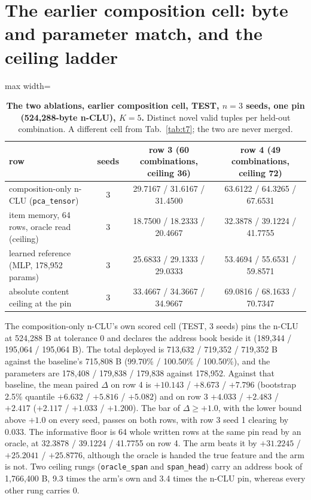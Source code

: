 \documentclass{article} %
\begin{document}
\section{The earlier composition cell: byte and parameter match, and the ceiling ladder}
\label{app:w5}

\begin{table}[h]
\centering\small
\caption{\textbf{The two ablations, earlier composition cell, TEST, $n=3$ seeds, one pin
(524,288-byte n-CLU), $K=5$.} Distinct novel valid tuples per held-out combination. A different cell from %
Tab.~\ref{tab:t7}; the two are never merged.}
\label{tab:ablations}
\setlength{\tabcolsep}{3pt}
\begin{adjustbox}{max width=\linewidth}\begin{tabular}{lccc}
\toprule
row & seeds & row 3 (60 combinations, ceiling 36) & row 4 (49 combinations, ceiling 72) \\ %
\midrule
composition-only n-CLU (\texttt{pca\_tensor}) & 3 & 29.7167 / 31.6167 / 31.4500 & 63.6122 / 64.3265 / 67.6531 \\
item memory, 64 rows, oracle read (ceiling) & 3 & 18.7500 / 18.2333 / 20.4667 & 32.3878 / 39.1224 / 41.7755 \\
learned reference (MLP, 178,952 params) & 3 & 25.6833 / 29.1333 / 29.0333 & 53.4694 / 55.6531 / 59.8571 \\
absolute content ceiling at the pin & 3 & 33.4667 / 34.3667 / 34.9667 & 69.0816 / 68.1633 / 70.7347 \\
\bottomrule
\end{tabular}\end{adjustbox}
\end{table}



The composition-only n-CLU's own scored cell (TEST, 3 seeds) pins the n-CLU at 524,288 B at
tolerance 0 and declares the address book beside it (189,344 / 195,064 / 195,064 B). The total
deployed is 713,632 / 719,352 / 719,352 B against the baseline's 715,808 B (99.70\% / 100.50\% /
100.50\%), and the parameters are 178,408 / 179,838 / 179,838 against 178,952. %
Against that baseline, the mean paired $\Delta$ on row 4 is $+10.143$ / $+8.673$ / $+7.796$ (bootstrap
2.5\% quantile $+6.632$ / $+5.816$ / $+5.082$) and on row 3 $+4.033$ / $+2.483$ / $+2.417$
($+2.117$ / $+1.033$ / $+1.200$). The bar of $\Delta\ge+1.0$, with the lower bound above $+1.0$ on
every seed, passes on both rows, with row 3 seed 1 clearing by 0.033.
The informative floor is 64 whole written rows at the same pin read by an oracle, at 32.3878 /
39.1224 / 41.7755 on row 4. The arm beats it by $+31.2245$ / $+25.2041$ / $+25.8776$, although the
oracle is handed the true feature and the arm is not. %
Two ceiling rungs (\texttt{oracle\_span} and \texttt{span\_head}) carry an address book of 1,766,400
B, 9.3 times the arm's own and 3.4 times the n-CLU pin, whereas every other rung carries 0.
\end{document}

